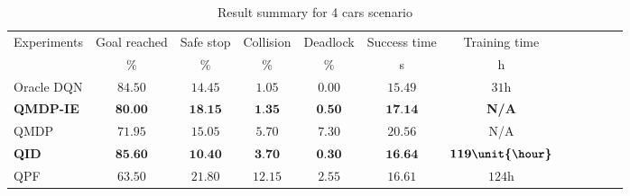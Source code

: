 

\begin{table}
\caption{Result summary for 4 cars scenario}
\label{tab:results_summary}
\begin{tabularx}{\columnwidth}{@{}l*{10}{c}c@{}}
\toprule
Experiments     & Goal reached & Safe stop & Collision & Deadlock & Success time & Training time\\ 
     & $\%$ & $\%$ & $\%$ & $\%$ & s & h\\ 
\midrule
Oracle DQN    & $84.50$ & $14.45$ & $1.05$ & $0.00$ & $15.49$ & $31\unit{\hour}$ \\ %
\textbf{QMDP-IE}   & $\textbf{80.00}$ & $\textbf{18.15}$ & $\textbf{1.35}$ & $\textbf{0.50}$ & $\textbf{17.14}$ & \textbf{N/A} \\ 
QMDP      & $71.95$ & $15.05$ & $5.70$ & $7.30$ & $20.56$ & N/A\\ 
\textbf{QID}       & $\textbf{85.60}$ & $\textbf{10.40}$ & $\textbf{3.70}$ & $\textbf{0.30}$ & $\textbf{16.64}$ & $\textbf{119\unit{\hour}}$ \\ %
QPF       & $63.50$ & $21.80$ & $12.15$ & $2.55$ & $16.61$ & $124\unit{\hour}$ \\ %

\bottomrule
\end{tabularx}
\end{table}

